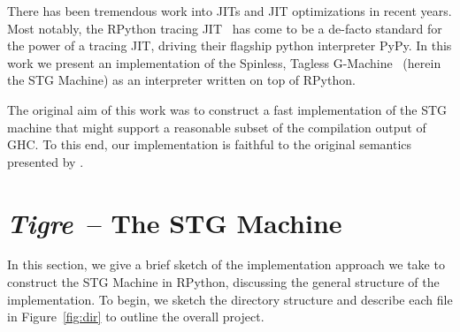 \documentclass[preprint]{sigplanconf}
\begin{document}
There has been tremendous work into JITs and JIT optimizations in recent years.
Most notably, the RPython tracing JIT~\cite{Bolz:2009} has come to be
a de-facto standard for the power of a tracing JIT, driving their
flagship python interpreter PyPy. In this work we present an
implementation of the Spinless, Tagless
G-Machine~\cite{spj:stgmachine} (herein the STG Machine) as an
interpreter written on top of RPython. 

The original aim of this work was to construct a fast implementation of the
STG machine that might support a reasonable subset of the compilation output
of GHC. To this end, our implementation is faithful to the original semantics
presented by \citet{spj:stgmachine}.

\section{\emph{Tigre}~-- The STG Machine} %

In this section, we give a brief sketch of the implementation approach we take
to construct the STG Machine in RPython, discussing the general structure of the
implementation. To begin, we sketch the directory structure and describe each file
in Figure~\ref{fig:dir} to outline the overall project.
\end{document}
